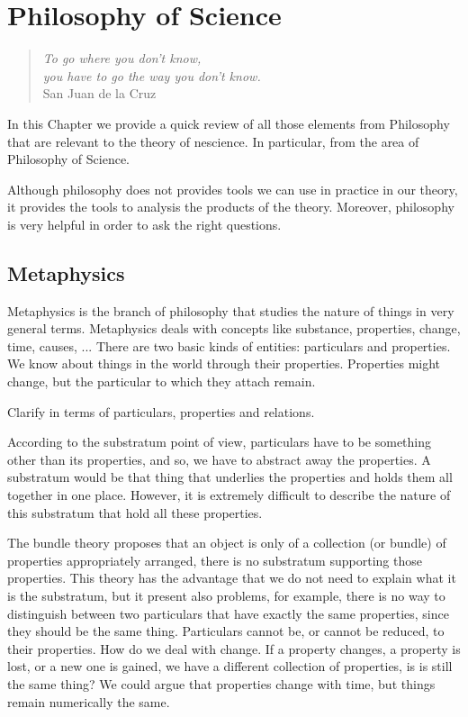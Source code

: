%
%


\chapter{Philosophy of Science}
\label{chap:Philosophy}

\begin{quote}
\begin{flushright}
\emph{To go where you don't know, \\
you have to go the way you don't know.} \\
San Juan de la Cruz 
\end{flushright}
\end{quote}
\bigskip

In this Chapter we provide a quick review of all those elements from Philosophy that are relevant to the theory of nescience. In particular, from the area of Philosophy of Science.

Although philosophy does not provides tools we can use in practice in our theory, it provides the tools to analysis the products of the theory. Moreover, philosophy is very helpful in order to ask the right questions.

%
%

\section{Metaphysics}

Metaphysics is the branch of philosophy that studies the nature of things in very general terms. Metaphysics deals with concepts like substance, properties, change, time, causes, ... There are two basic kinds of entities: particulars and properties. We know about things in the world through their properties. Properties might change, but the particular to which they attach remain.

{\color{red} Clarify in terms of particulars, properties and relations.}

According to the substratum point of view, particulars have to be something other than its properties, and so, we have to abstract away the properties. A substratum would be that thing that underlies the properties and holds them all together in one place. However, it is extremely difficult to describe the nature of this substratum that hold all these properties.

The bundle theory proposes that an object is only of a collection (or bundle) of properties appropriately arranged, there is no substratum supporting those properties. This theory has the advantage that we do not need to explain what it is the substratum, but it present also problems, for example, there is no way to distinguish between two particulars that have exactly the same properties, since they should be the same thing. Particulars cannot be, or cannot be reduced, to their properties. How do we deal with change. If a property changes, a property is lost, or a new one is gained, we have a different collection of properties, is is still the same thing? We could argue that properties change with time, but things remain numerically the same.

